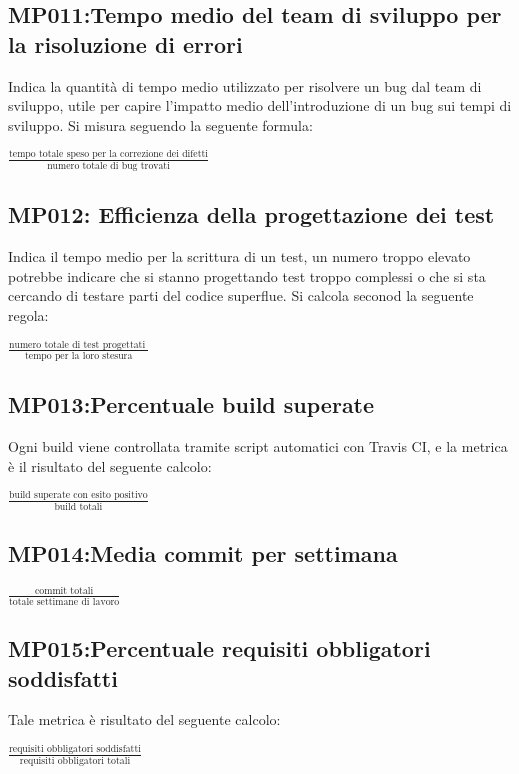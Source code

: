 \subsection{MP011:Tempo medio del team di sviluppo per la risoluzione di errori}
Indica la quantità di tempo medio utilizzato per risolvere un bug dal team di sviluppo, utile per capire l'impatto medio dell'introduzione di un bug sui tempi di sviluppo. Si misura seguendo la seguente formula:
\begin{center}
	\vspace{1em}
	$\frac{\mbox{tempo totale speso per la correzione dei difetti}}{\mbox{numero totale di bug trovati}}$
\end{center}


\subsection{MP012: Efficienza della progettazione dei test}
Indica il tempo medio per la scrittura di un test, un numero troppo elevato potrebbe indicare che si stanno progettando test troppo complessi  o che si sta cercando di testare  parti del codice superflue. Si calcola seconod la seguente regola:
\begin{center}
	\vspace{1em}
	$\frac{\mbox{numero totale di test progettati }}{\mbox{tempo per la loro stesura}}$\\
\end{center}


\subsection{MP013:Percentuale build superate}
Ogni build viene controllata tramite script automatici con Travis CI, e la metrica è il risultato del seguente calcolo:
\begin{center}
$\frac{\mbox{build superate con esito positivo}}{\mbox{build totali}}$
\end{center}


\subsection{MP014:Media commit per settimana}
\begin{center}
	$\frac{\mbox{commit totali}}{\mbox{totale settimane di lavoro}}$
\end{center}


\subsection{MP015:Percentuale requisiti obbligatori soddisfatti}
 Tale metrica è risultato del seguente calcolo:
 \begin{center}
 	$\frac{\mbox{requisiti obbligatori soddisfatti}}{\mbox{requisiti obbligatori totali}}$
 \end{center}

